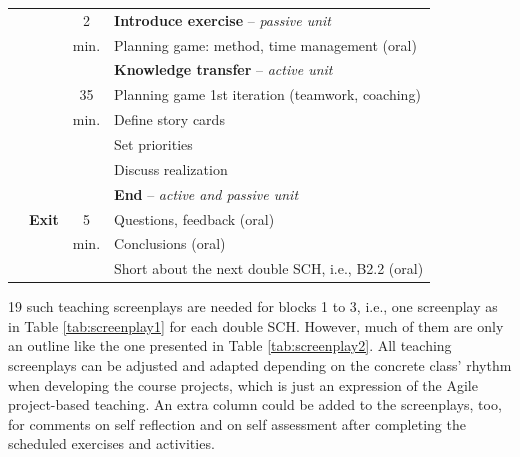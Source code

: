 \documentclass[conference]{IEEEtran}
\begin{document}
\begin{table}[!t]
\begin{tabular}{|c|c|c|l|}
    \cline{3-4}
         &                  & 2    & \textbf{Introduce exercise} -- \textit{passive unit} \\
         &                  & min. & \hspace{0.5em} Planning game: method, time management (oral) \\
    \cline{3-4}
         &                  &      & \textbf{Knowledge transfer} -- \textit{active unit} \\
         &                  & 35   & \hspace{0.5em} Planning game 1st iteration (teamwork, coaching) \\
         &                  & min. & \hspace{1em} Define story cards \\
         &                  &      & \hspace{1em} Set priorities \\
         &                  &      & \hspace{1em} Discuss realization \\
    \cline{2-4}
         &                  &      & \textbf{End} -- \textit{active and passive unit}\\
         & \textbf{Exit}    & 5    & \hspace{0.5em} Questions, feedback (oral) \\
         &                  & min. & \hspace{0.5em} Conclusions (oral) \\
         &                  &      & \hspace{0.5em} Short about the next double SCH, i.e., B2.2 (oral) \\
    \cline{1-4}
\end{tabular}
\end{table}

19 such teaching screenplays are needed for blocks 1 to 3, i.e., one screenplay as in Table \ref{tab:screenplay1} for each double SCH. However, much of them are only an outline like the one presented in Table \ref{tab:screenplay2}. All teaching screenplays can be adjusted and adapted depending on the concrete class' rhythm when developing the course projects, which is just an expression of the Agile project-based teaching. An extra column could be added to the screenplays, too, for comments on self reflection and on self assessment after completing the scheduled exercises and activities.


\end{document}
